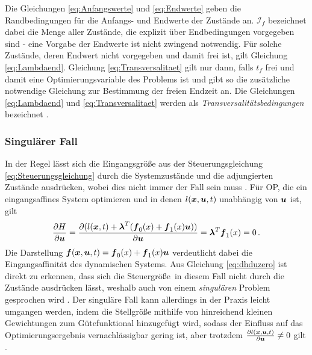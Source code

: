 Die Gleichungen \eqref{eq:Anfangswerte} und \eqref{eq:Endwerte} geben die Randbedingungen für die Anfangs- und Endwerte der Zustände an. $\mathcal{I}_f$ bezeichnet dabei die Menge aller Zustände, die explizit über Endbedingungen vorgegeben sind - eine Vorgabe der Endwerte ist nicht zwingend notwendig. Für solche Zustände, deren Endwert nicht vorgegeben und damit frei ist, gilt Gleichung \eqref{eq:Lambdaend}. Gleichung \eqref{eq:Transversalitaet} gilt nur dann, falls $t_f$ frei und damit eine Optimierungsvariable des Problems ist und gibt so die zusätzliche notwendige Gleichung zur Bestimmung der freien Endzeit an. Die Gleichungen \eqref{eq:Lambdaend} und \eqref{eq:Transversalitaet} werden als \textit{Transversalitätsbedingungen} bezeichnet \cite{KnutGraichen.2012}. 
\subsubsection{Singulärer Fall}\label{subsubsec:Singularität}
In der Regel lässt sich die Eingangsgröße aus der Steuerungsgleichung \eqref{eq:Steuerungsgleichung} durch die Systemzustände und die adjungierten Zustände ausdrücken, wobei dies nicht immer der Fall sein muss \cite{KnutGraichen.2012}. Für \gls{OP}, die ein eingangsaffines System optimieren und in denen $l(\boldsymbol{x},\boldsymbol{u},t)$ unabhängig von $\boldsymbol{u}$ ist, gilt 
\begin{equation}
	\frac{\partial H}{\partial \boldsymbol{u}} = \frac{\partial (l(\boldsymbol{x},t) + \boldsymbol{\lambda}^T(\boldsymbol{f}_0(x)+\boldsymbol{f}_1(x)\boldsymbol{u}))}{\partial \boldsymbol{u}} = \boldsymbol{\lambda}^T\boldsymbol{f}_1(x) = 0 \,. \label{eq:dhduzero}
\end{equation}
Die Darstellung $\boldsymbol{f}(\boldsymbol{x},\boldsymbol{u},t) = \boldsymbol{f}_0(x)+\boldsymbol{f}_1(x)\boldsymbol{u}$ verdeutlicht dabei die Eingangsaffinität des dynamischen Systems. Aus Gleichung \eqref{eq:dhduzero} ist direkt zu erkennen, dass sich die Steuergröße \uoft\,in diesem Fall nicht durch die Zustände ausdrücken lässt, weshalb auch von einem \textit{singulären} Problem gesprochen wird \cite{KnutGraichen.2012}. Der singuläre Fall kann allerdings in der Praxis leicht umgangen werden, indem die Stellgröße mithilfe von hinreichend kleinen Gewichtungen zum Gütefunktional hinzugefügt wird, sodass der Einfluss auf das Optimierungsergebnis vernachlässigbar gering ist, aber trotzdem $\frac{\partial l(\boldsymbol{x},\boldsymbol{u},t)}{\partial \boldsymbol{u}} \neq 0$ gilt \cite{KnutGraichen.2012}.
